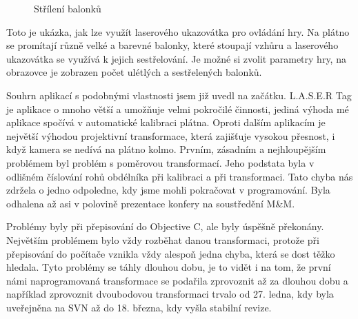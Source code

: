 \documentclass[twoside,12pt]{article}
\begin{document}
\begin{figure}[ht]
 \begin{center}
 \end{center}
 \caption{Střílení balonků}
\end{figure}
Toto je ukázka, jak lze využít laserového ukazovátka pro ovládání hry. Na plátno se promítají různě velké a barevné balonky, které stoupají vzhůru a laserového ukazovátka se využívá k jejich sestřelování. Je možné si zvolit parametry hry, na obrazovce je zobrazen počet ulétlých a sestřelených balonků.

Souhrn aplikací s podobnými vlastnosti jsem již uvedl na začátku. L.A.S.E.R Tag je aplikace o mnoho větší a umožňuje velmi pokročilé činnosti, jediná výhoda mé aplikace spočívá v automatické kalibraci plátna. Oproti dalším aplikacím je největší výhodou projektivní transformace, která zajišťuje vysokou přesnost, i když kamera se nedívá na plátno kolmo.
Prvním, zásadním a nejhloupějším problémem byl problém s poměrovou transformací. Jeho podstata byla v odlišném číslování rohů obdélníka při kalibraci a při transformaci. Tato chyba nás zdržela o jedno odpoledne, kdy jsme mohli pokračovat v programování. Byla odhalena až asi v polovině prezentace konfery na soustředění M\&M. 

Problémy byly při přepisování do Objective C, ale byly úspěšně překonány. Největším problémem bylo vždy rozběhat danou transformaci, protože při přepisování do počítače vznikla vždy alespoň jedna chyba, která se dost těžko hledala. Tyto problémy se táhly dlouhou dobu, je to vidět i na tom, že první námi naprogramovaná transformace se podařila zprovoznit až za dlouhou dobu a například zprovoznit dvoubodovou transformaci trvalo od 27. ledna, kdy byla uveřejněna na SVN až do 18. března, kdy vyšla stabilní revize.
\end{document}
